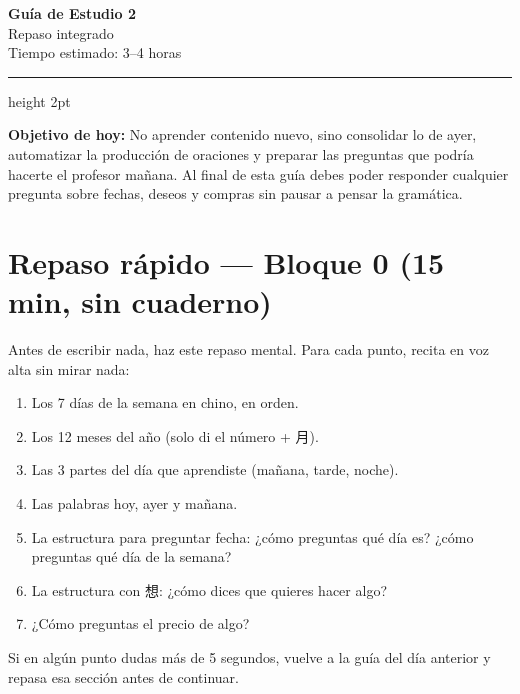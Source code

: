 \documentclass[12pt, a4paper]{article}
\begin{document}
\begin{center}
{\LARGE \textbf{\textcolor{azul}{Guía de Estudio 2}}}\\[4pt]
{\large Repaso integrado}\\[2pt]
{\normalsize Tiempo estimado: 3--4 horas}
\end{center}

\vspace{0.5em}
\hrule height 2pt
\vspace{1em}

\begin{cuadroverde}
\textbf{Objetivo de hoy:} No aprender contenido nuevo, sino consolidar lo de ayer, automatizar la producción de oraciones y preparar las preguntas que podría hacerte el profesor mañana. Al final de esta guía debes poder responder cualquier pregunta sobre fechas, deseos y compras sin pausar a pensar la gramática.
\end{cuadroverde}

\section{Repaso rápido — Bloque 0 (15 min, sin cuaderno)}

Antes de escribir nada, haz este repaso mental. Para cada punto, recita en voz alta sin mirar nada:

\begin{enumerate}[leftmargin=1.5cm]
\item Los 7 días de la semana en chino, en orden.
\item Los 12 meses del año (solo di el número + 月).
\item Las 3 partes del día que aprendiste (mañana, tarde, noche).
\item Las palabras hoy, ayer y mañana.
\item La estructura para preguntar fecha: ¿cómo preguntas qué día es? ¿cómo preguntas qué día de la semana?
\item La estructura con 想: ¿cómo dices que quieres hacer algo?
\item ¿Cómo preguntas el precio de algo?
\end{enumerate}

Si en algún punto dudas más de 5 segundos, vuelve a la guía del día anterior y repasa esa sección antes de continuar.

\end{document}
